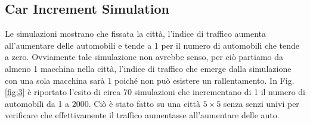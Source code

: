 \documentclass[main.tex]{subfiles}
\begin{document}
    
    \subsection{Car Increment Simulation}
        Le simulazioni mostrano che fissata la città, l'indice di traffico aumenta all'aumentare delle automobili
        e tende a 1 per il numero di automobili che tende a zero. Ovviamente tale simulazione non avrebbe senso, per ciò 
        partiamo da almeno 1 macchina nella città, l'indice di traffico che emerge dalla simulazione con una sola macchina
        sarà 1 poiché non può esistere un rallentamento.
        In Fig. \ref{fig:3} è riportato l'esito di circa 70 simulazioni che incrementano di 1 il numero di automobili da 1 a 2000.
        Ciò è stato fatto su una città $5 \times 5$ senza senzi univi per verificare che effettivamente il traffico aumentasse
        all'aumentare delle auto.
\end{document}
